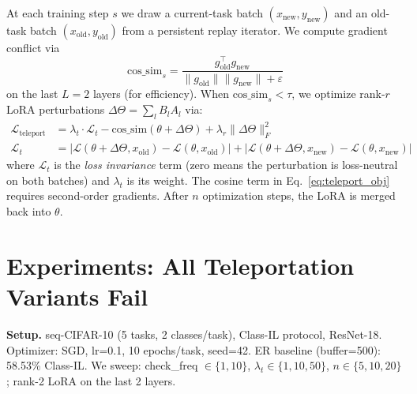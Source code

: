 \documentclass[11pt,a4paper]{article}
\newcommand{\cossim}{\mathrm{cos\_sim}}
\begin{document}
At each training step $s$ we draw a current-task batch $(x_\mathrm{new}, y_\mathrm{new})$
and an old-task batch $(x_\mathrm{old}, y_\mathrm{old})$ from a persistent replay iterator.
We compute gradient conflict via
\begin{equation}
  \cossim_s = \frac{g_\mathrm{old}^\top g_\mathrm{new}}{\|g_\mathrm{old}\|\|g_\mathrm{new}\| + \varepsilon}
  \label{eq:cossim}
\end{equation}
on the last $L=2$ layers (for efficiency). When $\cossim_s < \tau$, we optimize
rank-$r$ LoRA perturbations $\Delta\Theta = \sum_l B_l A_l$ via:
\begin{align}
  \mathcal{L}_\mathrm{teleport} &= \lambda_t \cdot \mathcal{L}_t
    - \cossim(\theta + \Delta\Theta)
    + \lambda_r \|\Delta\Theta\|_F^2
  \label{eq:teleport_obj} \\
  \mathcal{L}_t &= \big|\mathcal{L}(\theta{+}\Delta\Theta, x_\mathrm{old}) - \mathcal{L}(\theta, x_\mathrm{old})\big|
    + \big|\mathcal{L}(\theta{+}\Delta\Theta, x_\mathrm{new}) - \mathcal{L}(\theta, x_\mathrm{new})\big|
    \label{eq:lt}
\end{align}
where $\mathcal{L}_t$ is the \emph{loss invariance} term (zero means the perturbation is
loss-neutral on both batches) and $\lambda_t$ is its weight.
The cosine term in Eq.~\ref{eq:teleport_obj} requires second-order gradients.
After $n$ optimization steps, the LoRA is merged back into $\theta$.

\section{Experiments: All Teleportation Variants Fail}
\label{sec:h7}

\textbf{Setup.}
seq-CIFAR-10 (5 tasks, 2 classes/task), Class-IL protocol, ResNet-18.
Optimizer: SGD, lr=0.1, 10 epochs/task, seed=42.
ER baseline (buffer=500): 58.53\% Class-IL.
We sweep: check\_freq $\in \{1, 10\}$, $\lambda_t \in \{1, 10, 50\}$, $n \in \{5, 10, 20\}$;
rank-2 LoRA on the last 2 layers.
\end{document}
